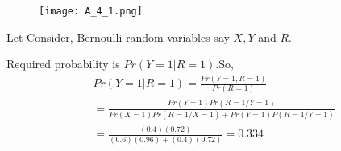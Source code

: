 %
\begin{figure}[htb!]
\begin{center}
\texttt{[image: A\_4\_1.png]}
\end{center}
\end{figure}
Let Consider, Bernoulli random variables say $X,Y$ and $R$.
\begin{table}[h]
\caption{probability of random variables.}
\label{tab:my-table}
\end{table}
Required probability is $Pr(Y=1|R=1)$.So,
\begin{align}
&Pr(Y=1|R=1)=\frac{Pr(Y=1,R=1)}{Pr(R=1)}\\
&=\frac{Pr(Y=1)Pr(R=1/Y=1)}{Pr(X=1)Pr(R=1/X=1)+Pr(Y=1)P(R=1/Y=1)}\\
&=\frac{(0.4)(0.72)}{(0.6)(0.96)+(0.4)(0.72)}=0.334
\end{align}